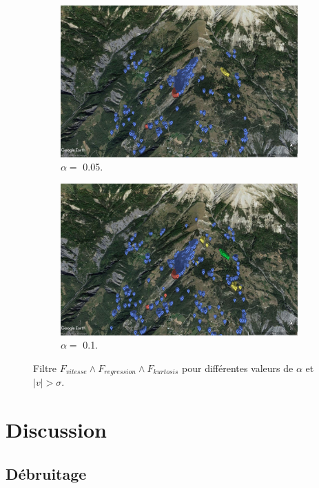 \documentclass[11pt, openany]{report}
\begin{document}
\begin{figure}[!h]
  \begin{subfigure}[b]{0.5\textwidth}
    \includegraphics[width=\textwidth]{test_vel_reg_kurtosis_0.jpg}
    \caption{$\alpha = $ 0.05.}
    \label{fig:f1}
  \end{subfigure}
  \hfill
  \begin{subfigure}[b]{0.5\textwidth}
    \includegraphics[width=\textwidth]{test_vel_reg_kurtosis_1.jpg}
    \caption{$\alpha = $ 0.1.}
    \label{fig:f2}
  \end{subfigure}
  \caption{Filtre $F_{vitesse} \wedge F_{regression} \wedge  F_{kurtosis}$ pour différentes valeurs de $\alpha$ et $|v| > \sigma $.}
\end{figure}
\newpage
\section{Discussion}
\subsection{Débruitage}
\end{document}
